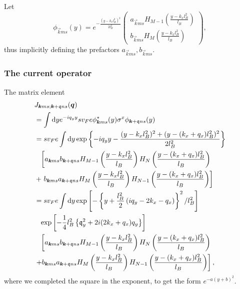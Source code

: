 Let
\begin{equation}
  \label{eq:13}
  \phi _{\vec{k}ms}(y)
  = e^{-\frac{(y-k_xl_B^2)^2}{2 l_{B}^2}}
  \begin{pmatrix}
    a_{\vec{k}ms} H_{M-1} \left( \frac{y - k_xl_B^2}{l_B} \right)\\
    b_{\vec{k}ms} H_M \left( \frac{y - k_xl_B^2}{l_B} \right)
  \end{pmatrix},
\end{equation}
thus implicitly defining the prefactors $a_{\vec{k} ms}, b_{\vec{k} ms}$.


\subsubsection{The current operator}
The matrix element
\begin{align}
  &J_{\vec{k}ms; \vec{k}+\qvec{q} ns}(\vec{q})\\
  \nonumber &=  \int \mathrm{d}y
    e^{-iq_yy} sv_Fe \phi ^{*}_{\vec{k}ms}(y)
    \sigma ^x
    \phi _{\vec{k} +\qvec{q}ns}(y)\\
  &= s v_F e \int \mathrm{d}y
    \exp \left\{
    - i q_yy - \frac{(y-k_xl_B^2)^2 + (y-(k_x + q_x) l_B^2)^2}{2 l_B^2}
    \right\}\\
  \nonumber &\pe \left[
    a_{\vec{k}ms}b_{\vec{k} + \qvec{q} ns} H_{M-1} \left( \frac{y - k_xl_B^2}{l_B} \right) H_N\left( \frac{y - (k_x + q_x) l_B^2}{l_B} \right)\right.\\
  \nonumber &+
    \left.  b_{\vec{k}ms} a_{\vec{k} + \qvec{q} ns}
    H_M \left( \frac{y - k_xl_B^2}{l_B} \right)
    H_{N-1} \left( \frac{y - (k_x+ q_x) l_B^2}{l_B} \right)
    \right]\\
  &= s v_F e \int \mathrm{d}y
    \exp \left[-\left\{
    y+ \frac{l_B^2}{2} \left( iq_y - 2k_x - q_x \right)
    \right\}^2 /l_B^2\right]\\
  \nonumber &\pe \exp \left[- \frac{1}{4} l_B^2 \left\{
    \qvec{q}_y^2 + 2 i (2k_x + q_x) q_y 
    \right\}\right]\\
  \nonumber &\pe \left[
    a_{\vec{k}ms}b_{\vec{k} + \qvec{q} ns} H_{M-1} \left( \frac{y - k_xl_B^2}{l_B} \right) H_N\left( \frac{y - (k_x + q_x) l_B^2}{l_B} \right) \right.\\
  \nonumber &\left. +
    b_{\vec{k}ms} a_{\vec{k} + \qvec{q} ns}
    H_M \left( \frac{y - k_xl_B^2}{l_B} \right)
    H_{N-1} \left( \frac{y - (k_x + q_x) l_B^2}{l_B} \right)
    \right],
\end{align}
where we completed the square in the exponent, to get the form $e^{-a(y + b)^2}$.
